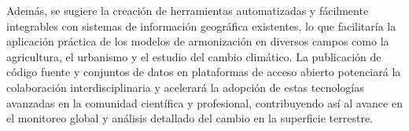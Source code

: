         Además, se sugiere la creación de herramientas automatizadas y fácilmente integrables con sistemas de información geográfica existentes, lo que facilitaría la aplicación práctica de los modelos de armonización en diversos campos como la agricultura, el urbanismo y el estudio del cambio climático. La publicación de código fuente y conjuntos de datos en plataformas de acceso abierto potenciará la colaboración interdisciplinaria y acelerará la adopción de estas tecnologías avanzadas en la comunidad científica y profesional, contribuyendo así al avance en el monitoreo global y análisis detallado del cambio en la superficie terrestre.